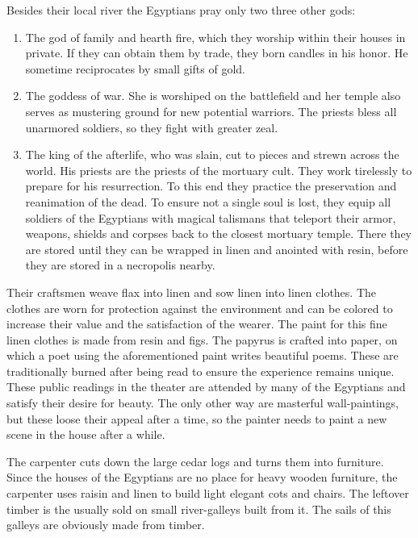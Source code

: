 \documentclass[a4paper]{book}
\begin{document}
	Besides their local river the \gls{Egyptians} pray only two three other gods:

	\begin{enumerate}
		\item The god of family and hearth fire, which they worship within their houses in private.
			If they can obtain them by trade, they born candles in his honor.
			He sometime reciprocates by small gifts of gold.
		\item The goddess of war. She is worshiped on the battlefield and her temple
			also serves as mustering ground for new potential warriors.
			The priests bless all unarmored soldiers, so they fight with greater zeal.
		\item The king of the afterlife, who was slain, cut to pieces and strewn across the world.
			His priests are the priests of the mortuary cult.
			They work tirelessly to prepare for his resurrection.
			To this end they practice the preservation and reanimation of the dead.
			To ensure not a single soul is lost,
			they equip all soldiers of the \gls{Egyptians} with magical talismans
			that teleport their armor, weapons, shields and corpses back to the closest mortuary temple.
			There they are stored until they can be wrapped in linen and anointed with resin,
			before they are stored in a necropolis nearby.
	\end{enumerate}

	Their craftsmen weave flax into linen and sow linen into linen clothes.
	The clothes are worn for protection against the environment
	and can be colored to increase their value and the satisfaction of the wearer. 
	The paint for this fine linen clothes is made from resin and figs.
	The papyrus is crafted into paper, on which a poet using the aforementioned paint
	writes beautiful poems.
	These are traditionally burned after being read to ensure the experience remains unique.
	These public readings in the theater are attended by many of the \gls{Egyptians}
	and satisfy their desire for beauty.
	The only other way are masterful wall-paintings,
	but these loose their appeal after a time,
	so the painter needs to paint a new scene in the house after a while.

	The carpenter cuts down the large cedar logs and turns them into furniture.
	Since the houses of the \gls{Egyptians} are no place for heavy wooden furniture,
	the carpenter uses raisin and linen to build light elegant cots and chairs.
	The leftover timber is the usually sold on small river-galleys built from it.
	The sails of this galleys are obviously made from timber.
\end{document}
